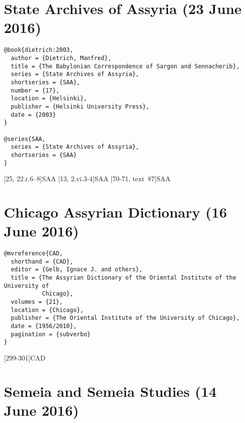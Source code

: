 \documentclass[a4paper]{article}
\begin{document}
\section{State Archives of Assyria (23 June 2016)}

\begin{verbatim}
@book{dietrich:2003,
  author = {Dietrich, Manfred},
  title = {The Babylonian Correspondence of Sargon and Sennacherib},
  series = {State Archives of Assyria},
  shortseries = {SAA},
  number = {17},
  location = {Helsinki},
  publisher = {Helsinki University Press},
  date = {2003}
}

@series{SAA,
  series = {State Archives of Assyria},
  shortseries = {SAA}
}
\end{verbatim}

[25, 22.r.6--8]{SAA}
[13, 2.vi.3-4]{SAA}
[70-71, text~87]{SAA}
\exampleabbreviations
\examplebibliography
{}

\section{Chicago Assyrian Dictionary (16 June 2016)}

\begin{verbatim}
@mvreference{CAD,
  shorthand = {CAD},
  editor = {Gelb, Ignace J. and others},
  title = {The Assyrian Dictionary of the Oriental Institute of the University of
           Chicago},
  volumes = {21},
  location = {Chicago},
  publisher = {The Oriental Institute of the University of Chicago},
  date = {1956/2010},
  pagination = {subverbo}
}
\end{verbatim}

[299-301]{CAD}
\exampleabbreviations
{}

\section{Semeia and Semeia Studies (14 June 2016)}
\end{document}
